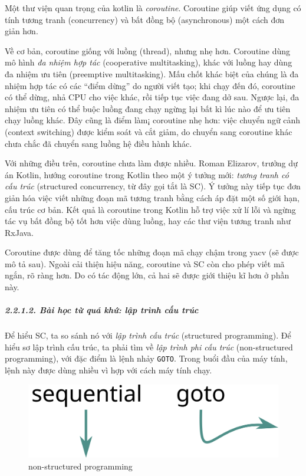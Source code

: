 \documentclass[
]{article}
\begin{document}
Một thư viện quan trọng của kotlin là \emph{coroutine}. Coroutine giúp
viết ứng dụng có tính tương tranh (concurrency) và bất đồng bộ
(asynchronous) một cách đơn giản hơn.

Về cơ bản, coroutine giống với luồng (thread), nhưng nhẹ hơn. Coroutine
dùng mô hình \emph{đa nhiệm hợp tác} (cooperative multitasking), khác
với luồng hay dùng đa nhiệm ưu tiên (preemptive multitasking). Mấu chốt
khác biệt của chúng là đa nhiệm hợp tác có các ``điểm dừng'' do người
viết tạo; khi chạy đến đó, coroutine có thể dừng, nhả CPU cho việc khác,
rồi tiếp tục việc đang dở sau. Ngược lại, đa nhiệm ưu tiên có thể buộc
luồng đang chạy ngừng lại bất kì lúc nào để ưu tiên chạy luồng khác. Đây
cũng là điểm làm¡ coroutine nhẹ hơn: việc chuyển ngữ cảnh (context
switching) được kiểm soát và cắt giảm, do chuyển sang coroutine khác
chưa chắc đã chuyển sang luồng hệ điều hành khác.

Với những điều trên, coroutine chưa làm được nhiều. Roman Elizarov,
trưởng dự án Kotlin, hướng coroutine trong Kotlin theo một ý tưởng mới:
\emph{tương tranh có cấu trúc} (structured concurrency, từ đây gọi tắt
là SC). Ý tưởng này tiếp tục đơn giản hóa việc viết những đoạn mã tương
tranh bằng cách áp đặt một số giới hạn, cấu trúc cơ bản. Kết quả là
coroutine trong Kotlin hỗ trợ việc xử lí lỗi và ngừng tác vụ bất đồng bộ
tốt hơn việc dùng luồng, hay các thư viện tương tranh như RxJava.

Coroutine được dùng để tăng tốc những đoạn mã chạy chậm trong yacv (sẽ
được mô tả sau). Ngoài cải thiện hiệu năng, coroutine và SC còn cho phép
viết mã ngắn, rõ ràng hơn. Do có tác động lớn, cả hai sẽ được giới thiệu
kĩ hơn ở phần này.

\hypertarget{buxe0i-hux1ecdc-tux1eeb-quuxe1-khux1ee9-lux1eadp-truxecnh-cux1ea5u-truxfac}{%
\subparagraph{2.2.1.2. Bài học từ quá khứ: lập trình cấu
trúc}\label{buxe0i-hux1ecdc-tux1eeb-quuxe1-khux1ee9-lux1eadp-truxecnh-cux1ea5u-truxfac}}

Để hiểu SC, ta so sánh nó với \emph{lập trình cấu trúc} (structured
programming). Để hiểu sơ lập trình cấu trúc, ta phải tìm về \emph{lập
trình phi cấu trúc} (non-structured programming), với đặc điểm là lệnh
nhảy \texttt{GOTO}. Trong buổi đầu của máy tính, lệnh này được dùng
nhiều vì hợp với cách máy tính chạy.

\begin{figure}
\centering
\includegraphics{../images/sequential-and-go-to-schematic.svg}
\caption{non-structured programming}
\end{figure}
\end{document}
